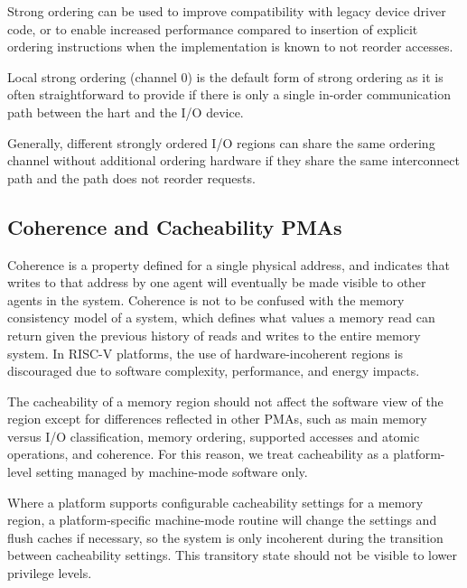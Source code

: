 \begin{commentary}
Strong ordering can be used to improve compatibility with legacy
device driver code, or to enable increased performance compared to
insertion of explicit ordering instructions when the implementation is
known to not reorder accesses.

Local strong ordering (channel 0) is the default form of strong
ordering as it is often straightforward to provide if there is only a
single in-order communication path between the hart and the I/O
device.

Generally, different strongly ordered I/O regions can share the same
ordering channel without additional ordering hardware if they share
the same interconnect path and the path does not reorder requests.
\end{commentary}

\subsection{Coherence and Cacheability PMAs}

Coherence is a property defined for a single physical address, and
indicates that writes to that address by one agent will eventually be
made visible to other agents in the system.  Coherence is not to be
confused with the memory consistency model of a system, which defines
what values a memory read can return given the previous history of
reads and writes to the entire memory system.  In RISC-V platforms,
the use of hardware-incoherent regions is discouraged due to software
complexity, performance, and energy impacts.

The cacheability of a memory region should not affect the software
view of the region except for differences reflected in other PMAs,
such as main memory versus I/O classification, memory ordering,
supported accesses and atomic operations, and coherence.  For this
reason, we treat cacheability as a platform-level setting managed by
machine-mode software only.

Where a platform supports configurable cacheability settings for a
memory region, a platform-specific machine-mode routine will change
the settings and flush caches if necessary, so the system is only
incoherent during the transition between cacheability settings.  This
transitory state should not be visible to lower privilege levels.

